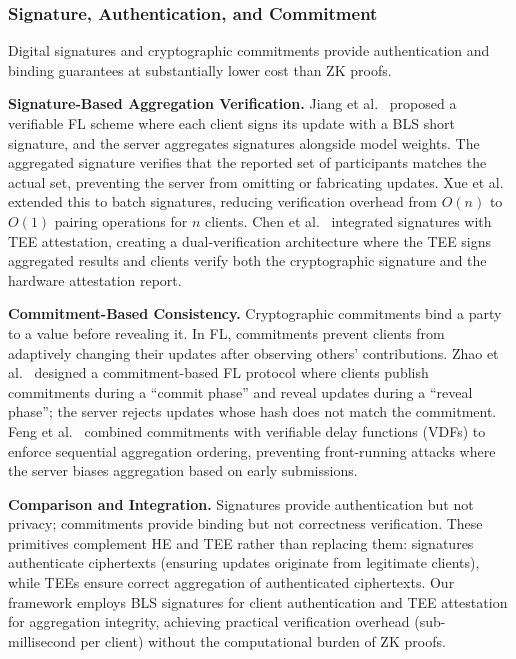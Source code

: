\subsubsection{Signature, Authentication, and Commitment}
\label{subsubsec:signature}

Digital signatures and cryptographic commitments provide authentication and binding guarantees at substantially lower cost than ZK proofs.

\textbf{Signature-Based Aggregation Verification.} Jiang et al.~\cite{jiang2022verifiable} proposed a verifiable FL scheme where each client signs its update with a BLS short signature, and the server aggregates signatures alongside model weights. The aggregated signature verifies that the reported set of participants matches the actual set, preventing the server from omitting or fabricating updates. Xue et al.~\cite{xue2022efficient} extended this to batch signatures, reducing verification overhead from $O(n)$ to $O(1)$ pairing operations for $n$ clients. Chen et al.~\cite{chen2022dual} integrated signatures with TEE attestation, creating a dual-verification architecture where the TEE signs aggregated results and clients verify both the cryptographic signature and the hardware attestation report.

\textbf{Commitment-Based Consistency.} Cryptographic commitments bind a party to a value before revealing it. In FL, commitments prevent clients from adaptively changing their updates after observing others' contributions. Zhao et al.~\cite{zhao2023commitment} designed a commitment-based FL protocol where clients publish commitments during a ``commit phase'' and reveal updates during a ``reveal phase''; the server rejects updates whose hash does not match the commitment. Feng et al.~\cite{feng2023verifiable} combined commitments with verifiable delay functions (VDFs) to enforce sequential aggregation ordering, preventing front-running attacks where the server biases aggregation based on early submissions.

\textbf{Comparison and Integration.} Signatures provide authentication but not privacy; commitments provide binding but not correctness verification. These primitives complement HE and TEE rather than replacing them: signatures authenticate ciphertexts (ensuring updates originate from legitimate clients), while TEEs ensure correct aggregation of authenticated ciphertexts. Our framework employs BLS signatures for client authentication and TEE attestation for aggregation integrity, achieving practical verification overhead (sub-millisecond per client) without the computational burden of ZK proofs.

